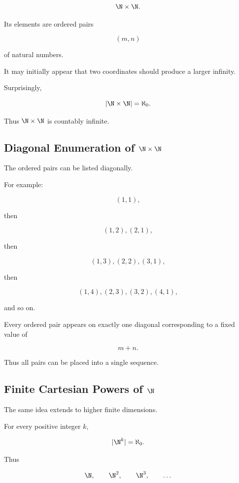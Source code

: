 \[ \N\times\N. \]

Its elements are ordered pairs

\[ (m,n) \]

of natural numbers.

It may initially appear that two coordinates should produce a larger
infinity.

Surprisingly,

\[ |\N\times\N|=\aleph_0. \]

Thus \(\N\times\N\) is countably infinite.

\subsection{Diagonal Enumeration of \(\N\times\N\)}
\label{subsec:diagonal-nxn}

The ordered pairs can be listed diagonally.

For example:

\[ (1,1), \]

then

\[ (1,2),(2,1), \]

then

\[ (1,3),(2,2),(3,1), \]

then

\[ (1,4),(2,3),(3,2),(4,1), \]

and so on.

Every ordered pair appears on exactly one diagonal corresponding to a fixed
value of

\[ m+n. \]

Thus all pairs can be placed into a single sequence.

\subsection{Finite Cartesian Powers of \(\N\)}
\label{subsec:finite-cartesian-powers-n}

The same idea extends to higher finite dimensions.

For every positive integer \(k\),

\[ |\N^k|=\aleph_0. \]

Thus

\[ \N,\qquad \N^2,\qquad \N^3,\qquad \ldots \]

